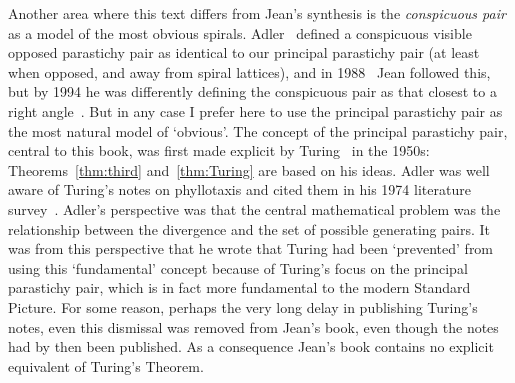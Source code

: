 Another area where this text differs from Jean's synthesis is the \emph{conspicuous pair} as a model of the most obvious spirals. Adler~\cite{adlerModelContactPressure1974} defined a conspicuous visible opposed parastichy pair as identical to our principal parastichy pair (at least when opposed, and away from spiral lattices), and in 1988~\cite[p214]{jeanNumbertheoreticPropertiesTwodimensional1988} Jean followed this, but by 1994 he was differently defining the conspicuous pair as that closest to a right angle~\cite[p18]{jeanPhyllotaxisSystemicStudy1994}. But in any case 
I prefer here to use the principal parastichy pair as the most natural model of `obvious'. 
The concept of the principal parastichy pair, central to this book, was first made explicit by Turing~\autocite{turingMorphogenTheoryPhyllotaxis2013} in the 1950s: Theorems~\ref{thm:third} and~\ref{thm:Turing} are based on his ideas. Adler was well aware of Turing's notes on phyllotaxis and cited them in his 1974 literature survey~\cite{adlerModelContactPressure1974}. Adler's perspective was that the central mathematical problem was the relationship between the divergence and the set of possible generating pairs. It was from this perspective that he wrote that Turing had been `prevented' from using this `fundamental' concept because of Turing's focus on the principal parastichy pair, which is in fact more fundamental to the modern Standard Picture. For some reason, perhaps the very long delay in publishing Turing's notes, even this dismissal was removed from Jean's book, even though the notes had by then been published. As a consequence Jean's book contains no explicit equivalent of Turing's Theorem. 

 
